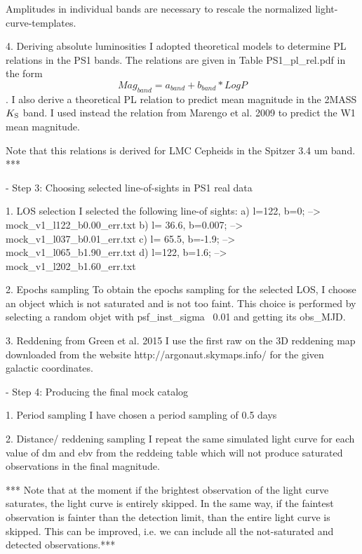             Amplitudes in individual bands are necessary to rescale the normalized light-curve-templates.


        4. Deriving absolute luminosities 
            I adopted theoretical models to determine PL relations in the PS1 bands.
            The relations are given in Table PS1_pl_rel.pdf in the form 
            $$Mag_{band}= a_{band} + b_{band} * Log P $$.
            I also derive a theoretical PL relation to predict mean magnitude in the 2MASS $K_{\rm{S}}$ band.
            I used instead the relation from Marengo et al. 2009 to predict the W1 mean magnitude.
     
            Note that this relations is derived for LMC Cepheids in the Spitzer 3.4 um band. ***


- Step 3: Choosing selected line-of-sights in PS1 real data
        
        1. LOS selection
                I selected the following line-of sights:
                 a) l=122, b=0;   --> mock_v1_l122_b0.00_err.txt
                 b) l= 36.6, b=0.007; -->  mock_v1_l037_b0.01_err.txt
                 c) l= 65.5, b=-1.9; --> mock_v1_l065_b1.90_err.txt
                 d) l=122, b=1.6; --> mock_v1_l202_b1.60_err.txt
             
        2. Epochs sampling
                To obtain the epochs sampling for the selected LOS, I choose an object which is not saturated and is not too faint.
                This choice is performed by selecting a random objet with psf_inst_sigma ~0.01
                and getting its obs_MJD.
            
        3. Reddening from Green et al. 2015
                I use the first raw on the 3D reddening map downloaded from the website http://argonaut.skymaps.info/ 
                for the given galactic coordinates.
    
        
- Step 4: Producing the final mock catalog
        
        1. Period sampling
            I have chosen a period sampling of 0.5 days
        
        2. Distance/ reddening sampling
                I  repeat the same simulated light curve for each value of  dm and ebv  from the reddeing table
                which will not produce saturated observations in the final magnitude.
        
        *** Note that at the moment if the brightest observation of the light curve saturates, the light curve is entirely skipped. 
        In the same way, if the faintest observation is fainter than the detection limit, than the entire light curve is skipped.
        This can be improved, i.e. we can include all the not-saturated and detected observations.***
        
